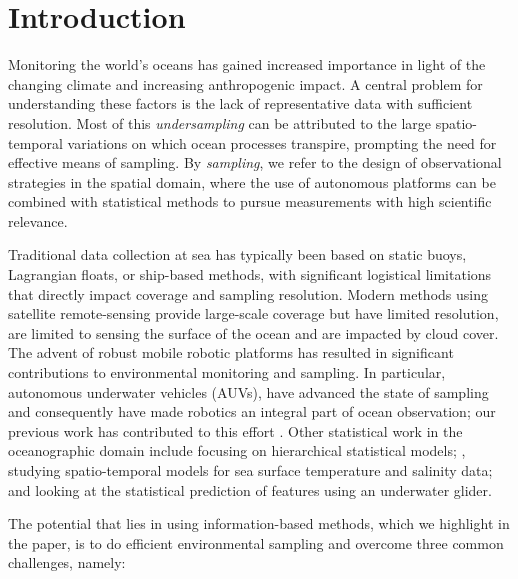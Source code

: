 \documentclass[aoas]{imsart}
\begin{document}
\section{Introduction}

Monitoring the world's oceans has gained increased importance in 
light of the changing climate and increasing anthropogenic impact. A
central problem for understanding these factors is the lack of
representative data with sufficient resolution. Most of this
\emph{undersampling} can be attributed to the large spatio-temporal
variations on which ocean processes transpire, prompting the need for
effective means of sampling. By \emph{sampling}, we refer to the design
of observational strategies in the spatial domain, where the use of
autonomous platforms can be combined with statistical methods to pursue
measurements with high scientific relevance.

Traditional data collection at sea has typically been based on static
buoys, Lagrangian floats, or ship-based methods, with significant
logistical limitations that directly impact coverage and sampling
resolution. Modern methods using satellite remote-sensing provide
large-scale coverage but have limited resolution, are limited to
sensing the surface of the ocean and are impacted by cloud cover. The
advent of robust mobile robotic platforms \citep{Bellingham07} has
resulted in significant contributions to environmental monitoring and
sampling. In particular, autonomous underwater vehicles (AUVs), have
advanced the state of sampling and consequently have made robotics an
integral part of ocean observation; our previous work has contributed
to this effort
\citep{das11b,Das2015,fossum18b,fossuminformation}.  Other statistical
work in the oceanographic domain include \cite{wikle2013modern}
focusing on hierarchical statistical models; \cite{sahu2008space},
studying spatio-temporal models for sea surface temperature and
salinity data; and \cite{mellucci2018oceanic} looking at the
statistical prediction of features using an underwater glider.

The potential that lies in using information-based methods, which we
highlight in the paper, is to do efficient environmental sampling and
overcome three common challenges, namely:
\end{document}
